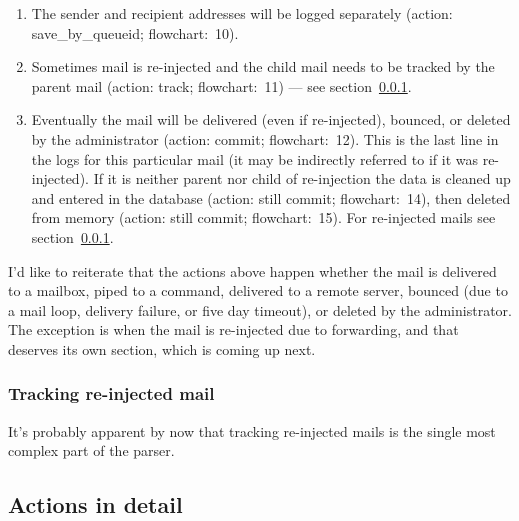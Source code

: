 \documentclass[a4paper,12pt,draft]{article}
\begin{document}
\begin{enumerate}

    \item The sender and recipient addresses will be logged separately
        (action: save\_by\_queueid; flowchart:~10).

    \item Sometimes mail is re-injected and the child mail needs to be
        tracked by the parent mail (action: track; flowchart:~11) --- see
        section~\ref{tracking-re-injected-mail}.

    \item Eventually the mail will be delivered (even if re-injected),
        bounced, or deleted by the administrator (action: commit;
        flowchart:~12).  This is the last line in the logs for this
        particular mail (it may be indirectly referred to if it was
        re-injected).  If it is neither parent nor child of re-injection
        the data is cleaned up and entered in the database (action: still
        commit; flowchart:~14), then deleted from memory (action: still
        commit; flowchart:~15).  For re-injected mails see 
        section~\ref{tracking-re-injected-mail}.

\end{enumerate}

I'd like to reiterate that the actions above happen whether the mail is
delivered to a mailbox, piped to a command, delivered to a remote server,
bounced (due to a mail loop, delivery failure, or five day timeout), or
deleted by the administrator.  The exception is when the mail is
re-injected due to forwarding, and that deserves its own section, which is
coming up next.

\subsubsection{Tracking re-injected mail}

\label{tracking-re-injected-mail}

It's probably apparent by now that tracking re-injected mails is the single
most complex part of the parser.

\subsection{Actions in detail}

\label{actions-in-detail}
\end{document}
